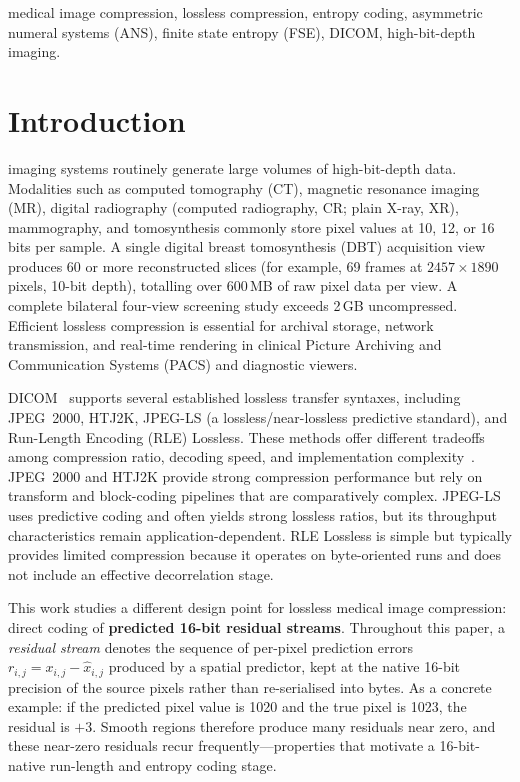 \documentclass[journal]{IEEEtran}
\begin{document}
\begin{IEEEkeywords}
medical image compression, lossless compression, entropy coding, asymmetric
numeral systems (ANS), finite state entropy (FSE), DICOM, high-bit-depth
imaging.
\end{IEEEkeywords}

\section{Introduction}
\label{sec:intro}

 imaging systems routinely generate large volumes of
high-bit-depth data. Modalities such as computed tomography (CT), magnetic
resonance imaging (MR), digital radiography (computed radiography,
CR; plain X-ray, XR), mammography, and tomosynthesis commonly store pixel
values at 10, 12, or 16 bits per sample. A single digital breast tomosynthesis
(DBT) acquisition view produces 60 or more reconstructed slices (for example,
69 frames at $2457 \times 1890$ pixels, 10-bit depth), totalling over
600\,MB of raw pixel data per view. A complete bilateral four-view screening
study exceeds 2\,GB uncompressed. Efficient lossless compression is essential
for archival storage, network transmission, and real-time rendering in clinical
Picture Archiving and Communication Systems (PACS) and diagnostic viewers.

DICOM~\cite{dicom} supports several established lossless transfer syntaxes,
including JPEG~2000, HTJ2K, JPEG-LS (a lossless/near-lossless predictive
standard), and Run-Length Encoding (RLE) Lossless. These methods offer
different tradeoffs among compression ratio, decoding speed, and
implementation complexity~\cite{liu2017,clunie2000}. JPEG~2000 and HTJ2K
provide strong compression performance but rely on transform and block-coding
pipelines that are comparatively complex. JPEG-LS uses predictive coding and
often yields strong lossless ratios, but its throughput characteristics remain
application-dependent. RLE Lossless is simple but typically provides limited
compression because it operates on byte-oriented runs and does not include an
effective decorrelation stage.

This work studies a different design point for lossless medical image
compression: direct coding of \textbf{predicted 16-bit residual streams}.
Throughout this paper, a \emph{residual stream} denotes the sequence of
per-pixel prediction errors $r_{i,j} = x_{i,j} - \hat{x}_{i,j}$ produced by a
spatial predictor, kept at the native 16-bit precision of the source pixels
rather than re-serialised into bytes. As a concrete example: if the predicted
pixel value is 1020 and the true pixel is 1023, the residual is $+3$.
Smooth regions therefore produce many residuals near zero, and these near-zero
residuals recur frequently---properties that motivate a 16-bit-native
run-length and entropy coding stage.
\end{document}
